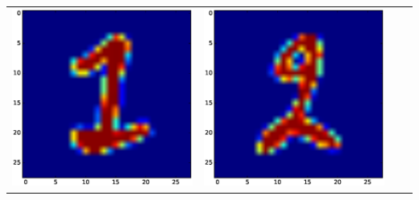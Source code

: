 \documentclass{article}
\begin{document}
\begin{tabular}{cccc}
\includegraphics[scale=.1]{fig/MNIST_962_1_0_962_1.eps}&
\includegraphics[scale=.1]{fig/MNIST_962_1_1_760_2.eps}&

\end{tabular}
\end{document}
